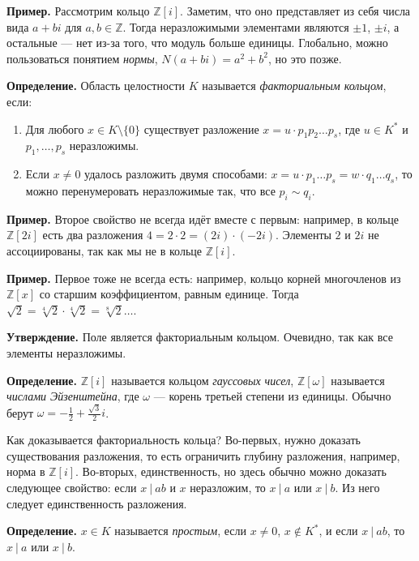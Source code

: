 \textbf{Пример.} Рассмотрим кольцо $\mathbb Z[i]$.
Заметим, что оно представляет из себя числа вида $a + bi$ для $a, b \in \mathbb Z$.
Тогда неразложимыми элементами являются $\pm 1$, $\pm i$, а остальные --- нет из-за того, что модуль больше единицы.
Глобально, можно пользоваться понятием \textit{нормы}, $N(a + bi) = a^2 + b^2$, но это позже.

\textbf{Определение.} Область целостности $K$ называется \textit{факториальным кольцом}, если:
\begin{enumerate}
    \item Для любого $x \in K \setminus \{0\}$ существует разложение $x = u \cdot p_1 p_2 \dots p_s$, где $u \in K^*$ и $p_1, \dots, p_s$ неразложимы.

    \item Если $x \ne 0$ удалось разложить двумя способами: $x = u \cdot p_1 \dots p_s = w \cdot q_1 \dots q_s$, то можно перенумеровать неразложимые так, что все $p_i \sim q_i$.
\end{enumerate}

\textbf{Пример.} Второе свойство не всегда идёт вместе с первым: например, в кольце $\mathbb Z[2i]$ есть два разложения $4 = 2 \cdot 2 = (2i) \cdot (-2i)$.
Элементы $2$ и $2i$ не ассоциированы, так как мы не в кольце $\mathbb Z[i]$.

\textbf{Пример.} Первое тоже не всегда есть: например, кольцо корней многочленов из $\mathbb Z[x]$ со старшим коэффициентом, равным единице.
Тогда $\sqrt 2 = \sqrt[4]{2} \cdot \sqrt[4]{2} = \sqrt[8]{2} \dots$.

\textbf{Утверждение.} Поле является факториальным кольцом. Очевидно, так как все элементы неразложимы.

\textbf{Определение.} $\mathbb Z[i]$ называется кольцом \textit{гауссовых чисел}, $\mathbb Z[\omega]$ называется \textit{числами Эйзенштейна}, где $\omega$ --- корень третьей степени из единицы.
Обычно берут $\omega = -\frac{1}{2} + \frac{\sqrt 3}{2} i$.

Как доказывается факториальность кольца?
Во-первых, нужно доказать существования разложения, то есть ограничить глубину разложения, например, норма в $\mathbb Z[i]$.
Во-вторых, единственность, но здесь обычно можно доказать следующее свойство: если $x~|~ab$ и $x$ неразложим, то $x~|~a$ или $x~|~b$.
Из него следует единственность разложения.

\textbf{Определение.} $x \in K$ называется \textit{простым}, если $x \ne 0$, $x \not\in K^*$, и если $x~|~ab$, то $x~|~a$ или $x~|~b$.

